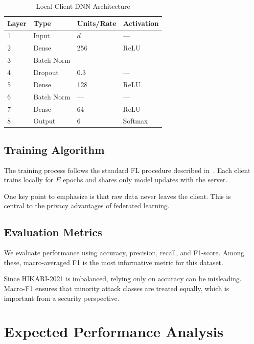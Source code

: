 \documentclass[conference]{IEEEtran}
\begin{document}
\begin{table}[h]
\centering
\caption{Local Client DNN Architecture}
\label{tab:dnn_arch}
\begin{tabular}{llll}
\hline
\textbf{Layer} & \textbf{Type}   & \textbf{Units/Rate} & \textbf{Activation} \\
\hline
1 & Input       & $d$ & ---     \\
2 & Dense       & 256 & ReLU    \\
3 & Batch Norm  & --- & ---     \\
4 & Dropout     & 0.3 & ---     \\
5 & Dense       & 128 & ReLU    \\
6 & Batch Norm  & --- & ---     \\
7 & Dense       & 64  & ReLU    \\
8 & Output      & 6   & Softmax \\
\hline
\end{tabular}
\end{table}

\subsection{Training Algorithm}

The training process follows the standard FL procedure described in~\cite{mcmahan2017}. Each client trains locally for $E$ epochs and shares only model updates with the server.

One key point to emphasize is that raw data never leaves the client. This is central to the privacy advantages of federated learning.

\subsection{Evaluation Metrics}

We evaluate performance using accuracy, precision, recall, and F1-score. Among these, macro-averaged F1 is the most informative metric for this dataset.

Since HIKARI-2021 is imbalanced, relying only on accuracy can be misleading. Macro-F1 ensures that minority attack classes are treated equally, which is important from a security perspective.


\section{Expected Performance Analysis}
\label{sec:performance}
\end{document}
